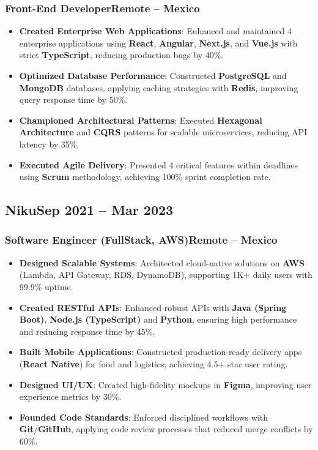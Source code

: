 \documentclass[a4paper,10pt]{article}
\newcommand{\kw}[1]{\textbf{\textcolor{keyword}{#1}}}
\newcommand{\tech}[1]{\textbf{\textcolor{tech}{#1}}}
\begin{document}
\subsubsection*{\small Front-End Developer\hfill Remote -- Mexico}
\begin{itemize}[noitemsep, leftmargin=*]
    \item \textbf{Created Enterprise Web Applications}: Enhanced and maintained 4 enterprise applications using \tech{React}, \tech{Angular}, \tech{Next.js}, and \tech{Vue.js} with strict \tech{TypeScript}, reducing production bugs by 40\%.
    \item \textbf{Optimized Database Performance}: Constructed \kw{PostgreSQL} and \kw{MongoDB} databases, applying caching strategies with \tech{Redis}, improving query response time by 50\%.
    \item \textbf{Championed Architectural Patterns}: Executed \kw{Hexagonal Architecture} and \kw{CQRS} patterns for scalable microservices, reducing API latency by 35\%.
    \item \textbf{Executed Agile Delivery}: Presented 4 critical features within deadlines using \kw{Scrum} methodology, achieving 100\% sprint completion rate.
\end{itemize}

\subsection*{\small Niku\hfill\textbf{Sep 2021 -- Mar 2023}}
\subsubsection*{\small Software Engineer (FullStack, AWS)\hfill Remote -- Mexico}
\begin{itemize}[noitemsep, leftmargin=*]
    \item \textbf{Designed Scalable Systems}: Architected cloud-native solutions on \tech{AWS} (Lambda, API Gateway, RDS, DynamoDB), supporting 1K+ daily users with 99.9\% uptime.
    \item \textbf{Created RESTful APIs}: Enhanced robust APIs with \tech{Java (Spring Boot)}, \tech{Node.js (TypeScript)} and \tech{Python}, ensuring high performance and reducing response time by 45\%.
    \item \textbf{Built Mobile Applications}: Constructed production-ready delivery apps (\tech{React Native}) for food and logistics, achieving 4.5+ star user rating.
    \item \textbf{Designed UI/UX}: Created high-fidelity mockups in \tech{Figma}, improving user experience metrics by 30\%.
    \item \textbf{Founded Code Standards}: Enforced disciplined workflows with \tech{Git}/\tech{GitHub}, applying code review processes that reduced merge conflicts by 60\%.
\end{itemize}
\end{document}

